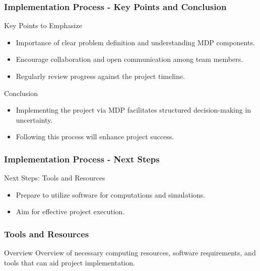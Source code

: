 \documentclass{beamer}
\begin{document}
\begin{frame}[fragile]
    \frametitle{Implementation Process - Key Points and Conclusion}

    \begin{block}{Key Points to Emphasize}
        \begin{itemize}
            \item Importance of clear problem definition and understanding MDP components.
            \item Encourage collaboration and open communication among team members.
            \item Regularly review progress against the project timeline.
        \end{itemize}
    \end{block}

    \begin{block}{Conclusion}
        \begin{itemize}
            \item Implementing the project via MDP facilitates structured decision-making in uncertainty.
            \item Following this process will enhance project success.
        \end{itemize}
    \end{block}
\end{frame}

\begin{frame}[fragile]
    \frametitle{Implementation Process - Next Steps}

    \begin{block}{Next Steps: Tools and Resources}
        \begin{itemize}
            \item Prepare to utilize software for computations and simulations.
            \item Aim for effective project execution.
        \end{itemize}
    \end{block}
\end{frame}

\begin{frame}[fragile]
    \frametitle{Tools and Resources}
    \begin{block}{Overview}
        Overview of necessary computing resources, software requirements, and tools that can aid project implementation.
    \end{block}
\end{frame}
\end{document}
